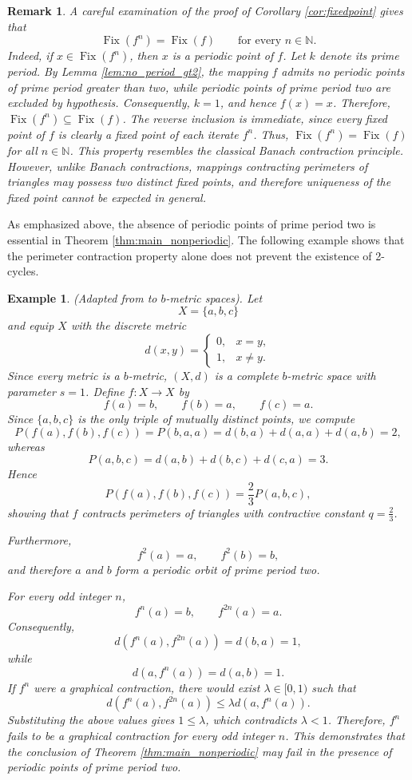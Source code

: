 \documentclass[a4paper,12pt,oneside]{article}
\newtheorem{remark}[theorem]{Remark}
\newtheorem{example}[theorem]{Example}
\numberwithin{equation}{section}
\begin{document}
\begin{remark}
\label{rem:fix_iter}
A careful examination of the proof of Corollary \ref{cor:fixedpoint} gives that
\[
\operatorname{Fix}(f^n) = \operatorname{Fix}(f)\qquad \text{for every } n\in \mathbb{N}.
\]
Indeed, if $x\in \operatorname{Fix}(f^n)$, then $x$ is a periodic point of $f$. Let $k$ denote its prime period. By Lemma \ref{lem:no_period_gt2}, the mapping $f$ admits no periodic points of prime period greater than two, while periodic points of prime period two are excluded by hypothesis. Consequently, $k=1$, and hence $f(x)=x$. Therefore, $\operatorname{Fix}(f^n)\subseteq \operatorname{Fix}(f)$. The reverse inclusion is immediate, since every fixed point of $f$ is clearly a fixed point of each iterate $f^n$. Thus, $\operatorname{Fix}(f^n) = \operatorname{Fix}(f)$ for all $n\in \mathbb{N}$. This property resembles the classical Banach contraction principle. However, unlike Banach contractions, mappings contracting perimeters of triangles may possess two distinct fixed points, and therefore uniqueness of the fixed point cannot be expected in general.
\end{remark}

As emphasized above, the absence of periodic points of prime period two is essential in Theorem \ref{thm:main_nonperiodic}. The following example shows that the perimeter contraction property alone does not prevent the existence of 2-cycles.

\begin{example}
\label{ex:2cycle}
(Adapted from \cite{cvetkovic2026} to $b$-metric spaces). Let
\[
X = \{a,b,c\}
\]
and equip $X$ with the discrete metric
\[
d(x,y) = 
\begin{cases}
0, & x=y,\\
1, & x\neq y.
\end{cases}
\]
Since every metric is a $b$-metric, $(X,d)$ is a complete $b$-metric space with parameter $s=1$. Define $f\colon X\to X$ by
\[
f(a) = b,\qquad f(b) = a,\qquad f(c) = a.
\]
Since $\{a,b,c\}$ is the only triple of mutually distinct points, we compute
\[
P(f(a),f(b),f(c)) = P(b,a,a) = d(b,a) + d(a,a) + d(a,b) = 2,
\]
whereas
\[
P(a,b,c) = d(a,b) + d(b,c) + d(c,a) = 3.
\]
Hence
\[
P(f(a),f(b),f(c)) = \frac{2}{3}P(a,b,c),
\]
showing that $f$ contracts perimeters of triangles with contractive constant $q = \frac{2}{3}$.

Furthermore,
\[
f^{2}(a) = a,\qquad f^{2}(b) = b,
\]
and therefore $a$ and $b$ form a periodic orbit of prime period two.

For every odd integer $n$,
\[
f^{n}(a) = b,\qquad f^{2n}(a) = a.
\]
Consequently,
\[
d(f^{n}(a),f^{2n}(a)) = d(b,a) = 1,
\]
while
\[
d(a,f^{n}(a)) = d(a,b) = 1.
\]
If $f^{n}$ were a graphical contraction, there would exist $\lambda \in [0,1)$ such that
\[
d(f^{n}(a),f^{2n}(a))\leq \lambda d(a,f^{n}(a)).
\]
Substituting the above values gives $1\leq \lambda$, which contradicts $\lambda<1$. Therefore, $f^{n}$ fails to be a graphical contraction for every odd integer $n$. This demonstrates that the conclusion of Theorem \ref{thm:main_nonperiodic} may fail in the presence of periodic points of prime period two.
\end{example}
\end{document}
